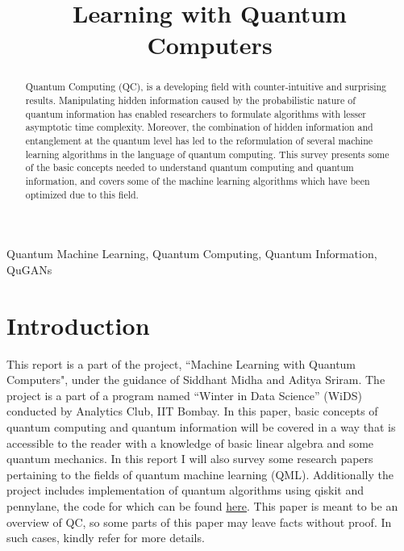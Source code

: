 \documentclass[conference]{IEEEtran}
\begin{document}
\title{Learning with Quantum Computers}


\author{
}

\maketitle

\begin{abstract}
Quantum Computing (QC), is a developing field with counter-intuitive and surprising results.
Manipulating hidden information caused by the probabilistic nature of quantum information has
enabled researchers to formulate algorithms with lesser asymptotic time complexity\cite{b1}.
Moreover, the combination of hidden information and entanglement at the quantum level has led to 
the reformulation of several machine learning algorithms in the language of quantum computing\cite{b2}\cite{b5}\cite{b7}.
This survey presents some of the basic concepts needed to understand quantum computing and quantum information, 
and covers some of the machine learning algorithms which have been optimized due to this field.
\end{abstract}

\begin{IEEEkeywords}
Quantum Machine Learning, Quantum Computing, Quantum Information, QuGANs
\end{IEEEkeywords}

\section{Introduction}
This report is a part of the project, ``Machine Learning with Quantum Computers"\cite{b3}, under
the guidance of Siddhant Midha and Aditya Sriram. The project is a part of a program named ``Winter in Data Science'' (WiDS)
conducted by Analytics Club, IIT Bombay. In this paper, basic concepts of quantum computing and quantum information 
will be covered in a way that is accessible to the reader with a knowledge of basic linear algebra and some quantum mechanics.
In this report I will also survey some research papers pertaining to the fields of quantum machine learning (QML). Additionally 
the project includes implementation of quantum algorithms using qiskit and pennylane, the code for which can be found \href{https://github.com/Ihsoj-Mahos/WiDS-QML}{here}.
This paper is meant to be an overview of QC, so some parts of this paper may leave facts without proof. In such cases, kindly refer \cite{b2} for more details.
\end{document}

